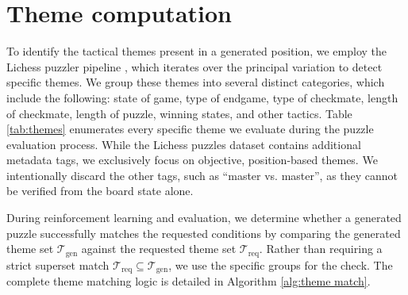 \section{Theme computation}
\label{sec:theme computation}

To identify the tactical themes present in a generated position, we employ the Lichess puzzler pipeline \cite{lichesspuzzler}, which iterates over the principal variation to detect specific themes. We group these themes into several distinct categories, which include the following: state of game, type of endgame, type of checkmate, length of checkmate, length of puzzle, winning states, and other tactics. Table \ref{tab:themes} enumerates every specific theme we evaluate during the puzzle evaluation process. While the Lichess puzzles dataset \cite{lichesspuzzledatabase} contains additional metadata tags, we exclusively focus on objective, position-based themes. We intentionally discard the other tags, such as ``master vs. master'', as they cannot be verified from the board state alone.

During reinforcement learning and evaluation, we determine whether a generated puzzle successfully matches the requested conditions by comparing the generated theme set $\mathcal{T}_{\text{gen}}$ against the requested theme set $\mathcal{T}_{\text{req}}$. Rather than requiring a strict superset match $\mathcal{T}_{\text{req}} \subseteq \mathcal{T}_{\text{gen}}$, we use the specific groups for the check. The complete theme matching logic is detailed in Algorithm \ref{alg:theme match}.

